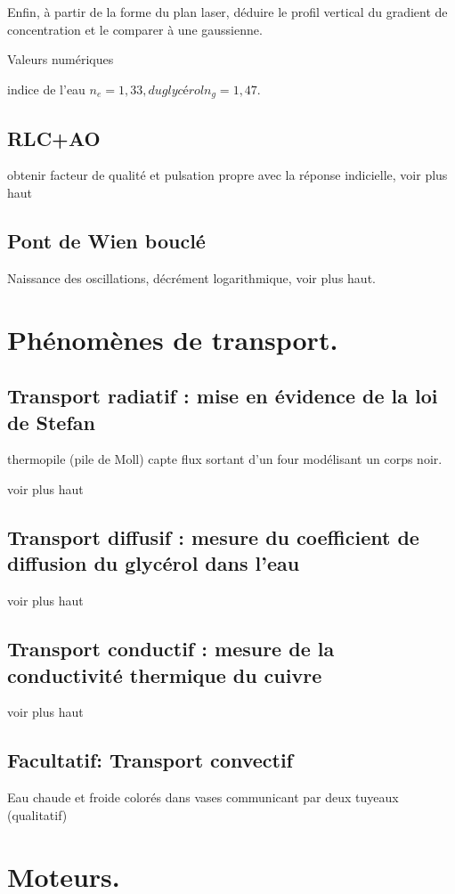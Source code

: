\documentclass{article}%
\begin{document}
Enfin, à partir de la forme du plan laser, déduire le profil vertical du gradient de concentration et le comparer à une gaussienne.

Valeurs numériques

indice de l'eau $n_{e} = 1,33, du glycérol n_{g} = 1,47$. 

\subsection{RLC+AO}
obtenir facteur de qualité et pulsation propre avec la réponse indicielle, voir plus haut
\subsection{Pont de Wien bouclé}
Naissance des oscillations, décrément logarithmique, voir plus haut.
\section{Phénomènes de transport.}
\subsection{Transport radiatif : mise en évidence de la loi de Stefan}
thermopile (pile de Moll) capte flux sortant d'un four modélisant un corps noir.

voir plus haut

\subsection{Transport diffusif : mesure du coefficient de diffusion du glycérol dans l'eau}

voir plus haut

\subsection{Transport conductif : mesure de la conductivité thermique du cuivre}

voir plus haut

\subsection{Facultatif: Transport convectif}
Eau chaude et froide colorés dans vases communicant par deux tuyeaux (qualitatif)

\section{Moteurs.}
\end{document}
